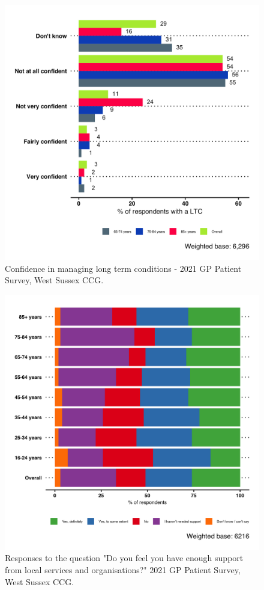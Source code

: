 \begin{figure}
    \caption{Confidence in managing long term conditions - 2021 GP Patient Survey, West Sussex CCG.}\label{fig:gpps_ltc_confidence}
    \centering
    \includegraphics[width=\linewidth]{images/GPPS_confident_LTC.png}
\end{figure}

\begin{figure}
    \caption{Responses to the question "Do you feel you have enough support from local services and organisations?" 2021 GP Patient Survey, West Sussex CCG.}\label{fig:gpps_support}
    \centering
    \includegraphics[width=\linewidth]{images/GPPS_support.png}
\end{figure}


